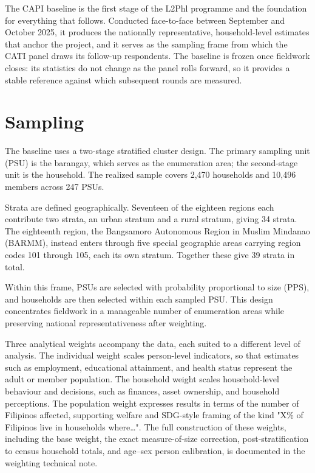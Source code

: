 
The CAPI baseline is the first stage of the L2Phl programme and the foundation for
everything that follows. Conducted face-to-face between September and October 2025,
it produces the nationally representative, household-level estimates that anchor the
project, and it serves as the sampling frame from which the CATI panel draws its
follow-up respondents. The baseline is frozen once fieldwork closes: its statistics
do not change as the panel rolls forward, so it provides a stable reference against
which subsequent rounds are measured.

\section{Sampling}

The baseline uses a two-stage stratified cluster design. The primary sampling unit
(PSU) is the barangay, which serves as the enumeration area; the second-stage unit
is the household. The realized sample covers 2,470 households and 10,496 members
across 247 PSUs.

Strata are defined geographically. Seventeen of the eighteen regions each
contribute two strata, an urban stratum and a rural stratum, giving 34 strata.
The eighteenth region, the Bangsamoro Autonomous Region in Muslim Mindanao
(BARMM), instead enters through five special geographic areas carrying region
codes 101 through 105, each its own stratum. Together these give 39 strata in
total.

Within this frame, PSUs are selected with probability proportional to size (PPS),
and households are then selected within each sampled PSU. This design concentrates
fieldwork in a manageable number of enumeration areas while preserving national
representativeness after weighting.

Three analytical weights accompany the data, each suited to a different level of
analysis. The individual weight scales person-level indicators, so that estimates
such as employment, educational attainment, and health status represent the adult
or member population. The household weight scales household-level behaviour and
decisions, such as finances, asset ownership, and household perceptions. The
population weight expresses results in terms of the number of Filipinos affected,
supporting welfare and SDG-style framing of the kind "X\% of Filipinos live in
households where\ldots". The full construction of these weights, including the base
weight, the exact measure-of-size correction, post-stratification to census
household totals, and age--sex person calibration, is documented in the weighting
technical note.


